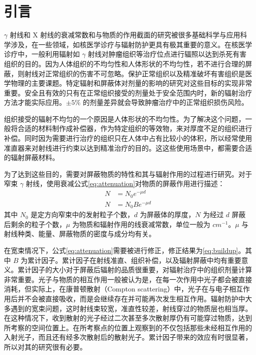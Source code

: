 \section{引言}

$\gamma$ 射线和 X 射线的衰减常数和与物质的作用截面的研究被很多基础科学与应用科学涉及，在一些领域，如核医学诊疗与辐射防护更具有极其重要的意义\cite{kerur_mass_2009}。在核医学诊疗中，一般利用辐射如 $\gamma$ 射线对肿瘤组织等治疗位点进行辐照以达到杀死有害组织的目的。因为人体组织的不均匀性和人体形状的不均匀性，若不进行合理的屏蔽，则射线对正常组织的伤害不可忽略。保护正常组织以及精准破坏有害组织是医学物理的主要课题。特定辐射和屏蔽体对剂量的影响的研究对这些目标的实现非常重要\cite{ding_need_2007}。安全且有效的只有在正常组织接受的剂量处于安全范围内时，新的辐射治疗方法才能实际应用。$\pm5\%$ 的剂量差异就会导致肿瘤治疗中的正常组织损伤风险\cite{dische_precision_1993}。

组织接受的辐射不均匀的一个原因是人体形状的不均匀性。为了解决这个问题，一般将合适的材料制作成补偿器，作为特定组织的等效物，来对厚度不足的组织进行补偿\cite{foster_influence_2009}。同时因为需要进行治疗的组织只在人体中占有比较小的体积，所以经常使用准直器来对射线进行约束以达到精准治疗的目的。这这些使用场景中，都需要合适的辐射屏蔽材料\cite{zhu_intensity-modulated_2005}。

为了达到这些目的，需要对屏蔽物质的特性和其与辐射作用的过程进行研究。对于窄束 $\gamma$ 射线，使用衰减公式\eqref{eq:attenuation}对物质的屏蔽作用进行描述\cite{foster_influence_2009}：
\begin{align}
    N &= N_0 e^{-\mu d} \label{eq:attenuation} \\
    N &= N_0 B e^{-\mu d} \label{eq:buildup}
\end{align}
其中 $N_0$ 是定方向窄束中的发射粒子个数，$d$ 为屏蔽体的厚度，$N$ 为经过 $d$ 屏蔽后剩余的粒子个数，$\mu$ 为物质和辐射作用的线衰减常数，单位一般为 $\si{cm^{-1}}$。$\mu$ 与射线种类、能量、屏蔽物质的密度与成分均有关。

在宽束情况下，公式\eqref{eq:attenuation}需要被进行修正，修正结果为\eqref{eq:buildup}。其中 $B$ 为累计因子。累计因子在射线准直、组织补偿，以及辐射屏蔽中均有重要意义。累计因子的大小对于屏蔽后辐射的品质很重要，对辐射治疗中的组织剂量计算非常重要。光子与物质的相互作用一般被认为是，在每一次作用中光子都会被直接消耗，但实际上，在康普顿散射（Compton scattering）中，光子在与电子相互作用后并不会被直接吸收，而是会继续存在并可能再次发生相互作用。辐射防护中大多遇到的宽束问题，这时射线束较宽，准直性较差，射线穿过的物质层也相当厚。在这种情况下，收到散射的光子经过二次甚至多次散射厚仍有可能穿过物质，达到所考察的空间位置上。在所考察点的位置上观察到的不仅包括那些未经相互作用的入射光子，而且还有经多次散射后的散射光子。累计因子带来的效应有时很显著，所以对其的研究很有必要。

